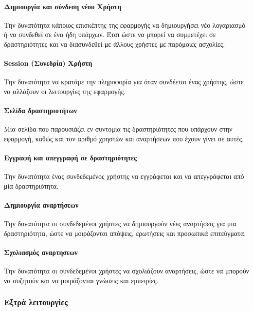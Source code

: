 \documentclass[acmtog, nonacm, language=english, language=greek]{acmart}
\newcommand{\en}[1]{\textlatin{#1}}
\begin{document}
\paragraph{Δημιουργία και σύνδεση νέου Χρήστη} Την δυνατότητα κάποιος επισκέπτης της εφαρμογής να δημιουργήσει νέο λογαριασμό ή να συνδεθεί σε ένα ήδη υπάρχων. Έτσι ώστε να μπορεί να συμμετέχει σε δραστηριότητες και να διασυνδεθεί με άλλους χρήστες με παρόμοιες ασχολίες.
 
\paragraph{\en{Session} (Συνεδρία) Χρήστη} Την δυνατότητα να κρατάμε την πληροφορία για όταν συνδέεται ένας χρήστης, ώστε να αλλάζουν οι λειτουργίες της εφαρμογής.
 
\paragraph{Σελίδα δραστηριοτήτων} Μία σελίδα που παρουσιάζει εν συντομία τις δραστηριότητες που υπάρχουν στην εφαρμογή, καθώς και τον αριθμό χρηστών και αναρτήσεων που έχουν γίνει σε αυτές.
 
\paragraph{Εγγραφή και απεγγραφή σε δραστηριότητες} Την δυνατότητα ένας συνδεδεμένος χρήστης να εγγράφεται και να απεγγράφεται από μία δραστηριότητα.
 
\paragraph{Δημιουργία αναρτήσεων} Την δυνατότητα οι συνδεδεμένοι χρήστες να δημιουργούν νέες αναρτήσεις για μια δραστηριότητα, ώστε να μοιράζονται απόψεις, ερωτήσεις και προσωπικά επιτεύγματα.
 
\paragraph{Σχολιασμός αναρτησεων} Την δυνατότητα οι συνδεδεμένοι χρήστες να σχολιάζουν αναρτήσεις, ώστε να μπορούν να συζητούν και να μοιράζονται γνώσεις και εμπειρίες.
 


\subsubsection{Εξτρά λειτουργίες}
\end{document}
